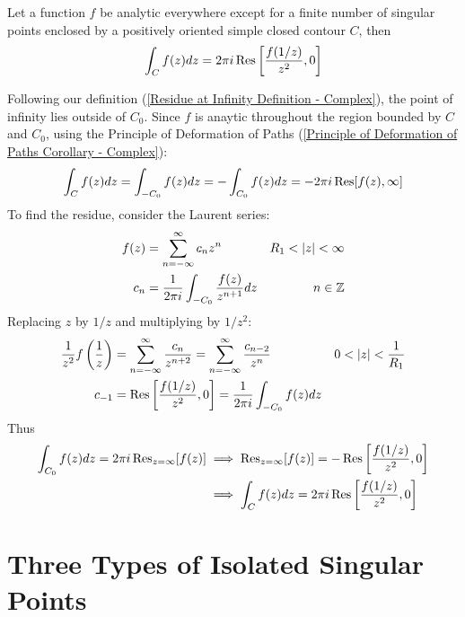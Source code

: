 \documentclass[12pt, english]{book}
\makeatletter
\renewenvironment{proof}[1][\proofname]{\par
	\pushQED{\qed}%
	\normalfont \topsep6\p@\@plus6\p@\relax
	\list{}{%
		\settowidth{\leftmargin}{\itshape\proofname:\hskip\labelsep}%
		\setlength{\labelwidth}{0pt}%
		\setlength{\itemindent}{-\leftmargin}%
		}%
	\item[\hskip\labelsep\itshape#1\@addpunct{:}]\ignorespaces
	}{\popQED\endlist\@endpefalse}
\makeatother
\begin{document}
	\begin{theorem}
		Let a function \(f\) be analytic everywhere except for a finite number of singular points enclosed by a positively oriented simple closed contour \(C\), then \begin{align*}
			\int_{C} f(z) dz 
			= 2\pi i \Res \left[ \frac{f(1/z)}{z^2}, 0 \right]
		\end{align*}
	\end{theorem}
	\begin{proof}
		Following our definition (\cref{Residue at Infinity Definition - Complex}), the point of infinity lies outside of \(C_0\). Since \(f\) is anaytic throughout the region bounded by \(C\) and \(C_0\), using the Principle of Deformation of Paths (\cref{Principle of Deformation of Paths Corollary - Complex}):
		\begin{align*}
			\int_{C} f(z) dz = \int_{-C_0} f(z) dz = - \int_{C_0} f(z) dz = -2\pi i \Res[f(z), \infty]
		\end{align*}
		To find the residue, consider the Laurent series:
		\begin{align*}
			f(z) &= \sum_{n=-\infty}^{\infty} c_n z^n & R_1 < \abs{z} < \infty \\
			c_n &= \frac{1}{2\pi i} \int_{-C_0} \frac{f(z)}{z^{n+1}} dz & n \in \mathbb{Z}
		\end{align*}
		Replacing \(z\) by \(1/z\) and multiplying by \(1/z^2\):
		\begin{align*}
			\frac{1}{z^2} f\left(\frac{1}{z}\right)
			&= \sum_{n=-\infty}^{\infty} \frac{c_n}{z^{n+2}} = \sum_{n=-\infty}^{\infty} \frac{c_{n-2}}{z^n} & 0 < \abs{z} < \frac{1}{R_1} \\
			c_{-1} &= \Res\left[\frac{f(1/z)}{z^2}, 0\right] = \frac{1}{2\pi i} \int_{-C_0} f(z) dz
		\end{align*}
		Thus
		\begin{align*}
			\int_{C_0} f(z) dz = 2\pi i \Res_{z=\infty}[f(z)]
			&\implies
			\Res_{z = \infty}[f(z)] = -\Res\left[\frac{f(1/z)}{z^2}, 0\right] \\
			&\implies
			\int_{C} f(z) dz = 2\pi i \Res\left[\frac{f(1/z)}{z^2}, 0\right]
		\end{align*}
	\end{proof}
	
	\section{Three Types of Isolated Singular Points} \label{Three Types of Isolated Singular Points Section - Complex}
	
\end{document}
